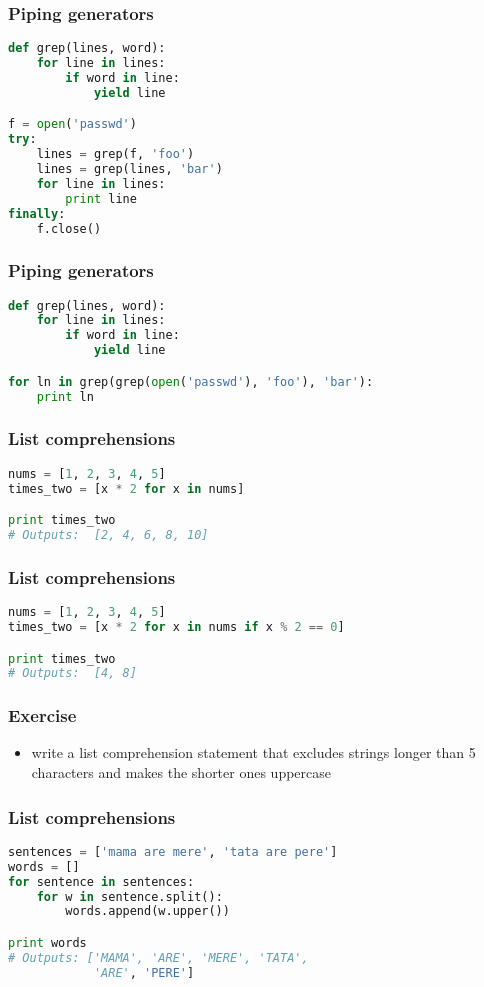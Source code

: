 \documentclass{beamer}
\begin{document}
\begin{frame}[fragile]
\frametitle{Piping generators}
\begin{lstlisting}[language=python]
def grep(lines, word):
    for line in lines:
        if word in line:
            yield line

f = open('passwd')
try:
    lines = grep(f, 'foo')
    lines = grep(lines, 'bar')
    for line in lines:
        print line
finally:
    f.close()
\end{lstlisting}
\end{frame}

\begin{frame}[fragile]
\frametitle{Piping generators}
\begin{lstlisting}[language=python]
def grep(lines, word):
    for line in lines:
        if word in line:
            yield line

for ln in grep(grep(open('passwd'), 'foo'), 'bar'):
    print ln
\end{lstlisting}

\end{frame}

\begin{frame}[fragile]
\frametitle{List comprehensions}
\begin{lstlisting}[language=python]
nums = [1, 2, 3, 4, 5]
times_two = [x * 2 for x in nums]

print times_two
# Outputs:  [2, 4, 6, 8, 10]
\end{lstlisting}
\end{frame}

\begin{frame}[fragile]
\frametitle{List comprehensions}
\begin{lstlisting}[language=python]
nums = [1, 2, 3, 4, 5]
times_two = [x * 2 for x in nums if x % 2 == 0]

print times_two
# Outputs:  [4, 8]
\end{lstlisting}
\end{frame}

\begin{frame}[fragile]
\frametitle{Exercise}
\begin{itemize}
  \item write a list comprehension statement that excludes strings longer than 5 characters
    and makes the shorter ones uppercase
\end{itemize}
\end{frame}

\begin{frame}[fragile]
\frametitle{List comprehensions}
\begin{lstlisting}[language=python]
sentences = ['mama are mere', 'tata are pere']
words = []
for sentence in sentences:
    for w in sentence.split():
        words.append(w.upper())

print words
# Outputs: ['MAMA', 'ARE', 'MERE', 'TATA',
            'ARE', 'PERE']

\end{lstlisting}
\end{frame}
\end{document}
